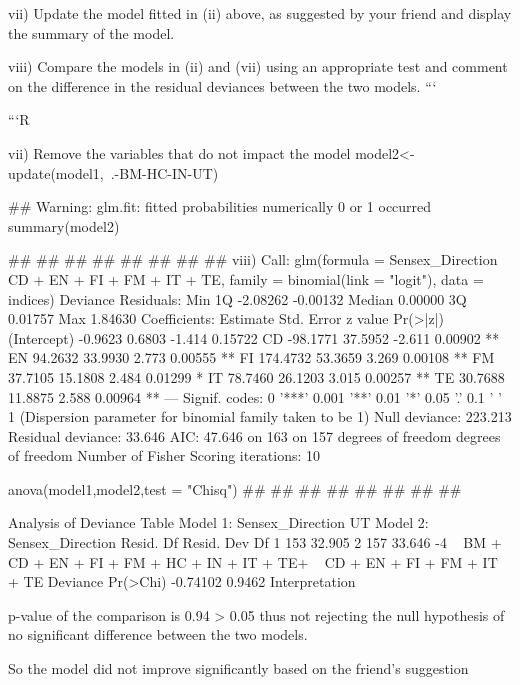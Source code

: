 \documentclass[a4paper,12pt]{article}
\begin{document}
vii) Update the model fitted in (ii) above, as suggested by your friend and display the summary
of the model.


viii) Compare the models in (ii) and (vii) using an appropriate test and comment on the
difference in the residual deviances between the two models.
```


```R

vii)
Remove the variables that do not impact the model
model2<-update(model1,~.-BM-HC-IN-UT)

## Warning: glm.fit: fitted probabilities numerically 0 or 1 occurred
summary(model2)




##
##
##
##
##
##
##
##
viii)
Call:
glm(formula = Sensex_Direction ~ CD + EN + FI + FM + IT + TE,
family = binomial(link = "logit"), data = indices)
Deviance Residuals:
Min
1Q
-2.08262 -0.00132
Median
0.00000
3Q
0.01757
Max
1.84630
Coefficients:
Estimate Std. Error z value Pr(>|z|)
(Intercept) -0.9623
0.6803 -1.414 0.15722
CD
-98.1771
37.5952 -2.611 0.00902 **
EN
94.2632
33.9930
2.773 0.00555 **
FI
174.4732
53.3659
3.269 0.00108 **
FM
37.7105
15.1808
2.484 0.01299 *
IT
78.7460
26.1203
3.015 0.00257 **
TE
30.7688
11.8875
2.588 0.00964 **
---
Signif. codes: 0 '***' 0.001 '**' 0.01 '*' 0.05 '.' 0.1 ' ' 1
(Dispersion parameter for binomial family taken to be 1)
Null deviance: 223.213
Residual deviance: 33.646
AIC: 47.646
on 163
on 157
degrees of freedom
degrees of freedom
Number of Fisher Scoring iterations: 10

anova(model1,model2,test = "Chisq")
##
##
##
##
##
##
##
##

Analysis of Deviance Table
Model 1: Sensex_Direction
UT
Model 2: Sensex_Direction
Resid. Df Resid. Dev Df
1
153
32.905
2
157
33.646 -4
~ BM + CD + EN + FI + FM + HC + IN + IT + TE+
~ CD + EN + FI + FM + IT + TE
Deviance Pr(>Chi)
-0.74102
0.9462
Interpretation








p-value of the comparison is 0.94 > 0.05 thus not rejecting the null hypothesis of no significant difference between the two models. 

So the model did not improve significantly based on the friend's suggestion
\end{document}
